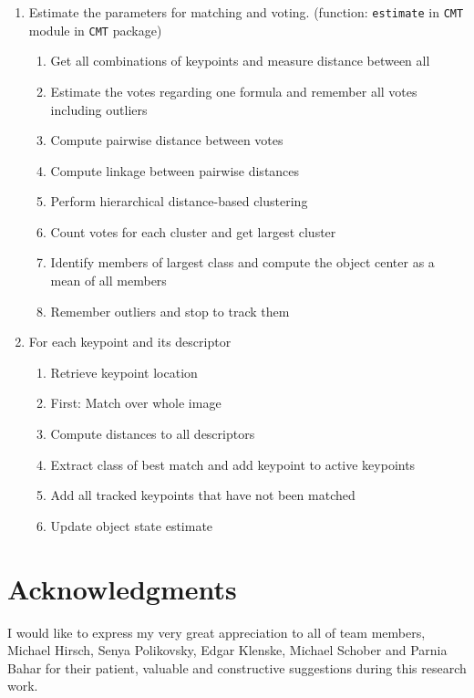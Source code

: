 \documentclass[[12pt,DIV14,BCOR12mm,a4paper,footexclude,headinclude,halfparskip-,twoside,openright,cleardoubleempty,idxtotoc,bibtotoc]{article}
\begin{document}
\begin{itemize}
\begin{enumerate}
	\item Estimate the parameters for matching and voting. (function: \texttt{estimate} in \texttt{CMT} module in \texttt{CMT} package)

\begin{enumerate}
    	\item Get all combinations of keypoints and measure distance between all
   	 \item Estimate the votes regarding one formula and remember all votes including outliers
	\item Compute pairwise distance between votes
	\item Compute linkage between pairwise distances
	\item Perform hierarchical distance-based clustering
	\item Count votes for each cluster and get largest cluster
	\item Identify members of largest class and compute the object center as a mean of all members
	\item Remember outliers and stop to track them
  \end{enumerate}

    \item For each keypoint and its descriptor

\begin{enumerate}
    	\item Retrieve keypoint location
   	 \item First: Match over whole image
	\item Compute distances to all descriptors
	\item Extract class of best match and add keypoint to active keypoints
	\item Add all tracked keypoints that have not been matched
	\item Update object state estimate
 \end{enumerate}

  \end{enumerate}

\end{itemize}







\section{Acknowledgments}

I would like to express my very great appreciation to all of team members, Michael Hirsch, Senya Polikovsky, Edgar Klenske, Michael Schober and Parnia Bahar for their patient, valuable and constructive suggestions during this research work.

\clearpage



\end{document}
